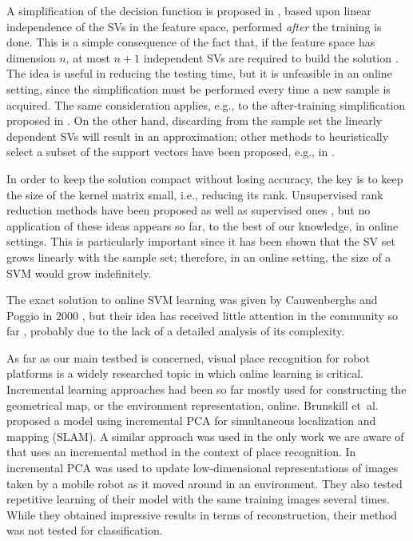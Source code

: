 A simplification of the decision function is proposed in
\cite{DownsGM01}, based upon linear independence of the SVs in the
feature space, performed \emph{after} the training is done. This is a
simple consequence of the fact that, if the feature space has
dimension $n$, at most $n+1$ independent SVs are required to build the
solution \cite{PontilV98}. The idea is useful in reducing the testing
time, but it is unfeasible in an online setting, since the
simplification must be performed every time a new sample is
acquired. The same consideration applies, e.g., to the after-training
simplification proposed in \cite{nguyen2005}. On the other hand,
discarding from the sample set the linearly dependent SVs will result
in an approximation; other methods to heuristically select a subset of
the support vectors have been proposed, e.g., in
\cite{LeeM01,schoel06,KeerthiCDC06}.

In order to keep the solution compact without losing accuracy, the key
is to keep the size of the kernel matrix small, i.e., reducing its
rank. Unsupervised rank reduction methods have been proposed
\cite{Baudat03} as well as supervised ones
\cite{BachJordan2005,KeerthiCDC06}, but no application of these ideas
appears so far, to the best of our knowledge, in online settings. This
is particularly important since it has been shown \cite{Steinwart03}
that the SV set grows linearly with the sample set; therefore, in an
online setting, the size of a SVM would grow indefinitely.

The exact solution to online SVM learning was given by Cauwenberghs
and Poggio in 2000 \cite{CauwenberghsP00}, but their idea has received
little attention in the community so far \cite{Laskov2006}, probably
due to the lack of a detailed analysis of its complexity.

As far as our main testbed is concerned, visual place recognition for
robot platforms is a widely researched topic in which online learning
is critical. Incremental learning approaches had been so far mostly
used for constructing the geometrical map, or the environment
representation, online.  Brunskill et~al. \cite{emma:irca05} proposed
a model using incremental PCA for simultaneous localization and
mapping (SLAM). A similar approach was used in the only work we are
aware of that uses an incremental method in the context of place
recognition. In \cite{ljubjiana:icra02} incremental PCA was used to
update low-dimensional representations of images taken by a mobile
robot as it moved around in an environment. They also tested
repetitive learning of their model with the same training images
several times. While they obtained impressive results in terms of
reconstruction, their method was not tested for classification.
